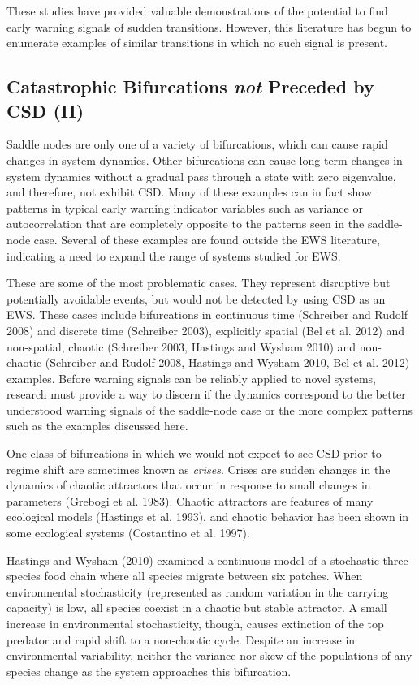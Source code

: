 \documentclass{article}
\begin{document}
These studies have provided valuable demonstrations of the potential to
find early warning signals of sudden transitions. However, this
literature has begun to enumerate examples of similar transitions in
which no such signal is present.

\subsection{Catastrophic Bifurcations \emph{not} Preceded by CSD (II)}

Saddle nodes are only one of a variety of bifurcations, which can cause
rapid changes in system dynamics. Other bifurcations can cause long-term
changes in system dynamics without a gradual pass through a state with
zero eigenvalue, and therefore, not exhibit CSD. Many of these examples
can in fact show patterns in typical early warning indicator variables
such as variance or autocorrelation that are completely opposite to the
patterns seen in the saddle-node case. Several of these examples are
found outside the EWS literature, indicating a need to expand the range
of systems studied for EWS.

These are some of the most problematic cases. They represent disruptive
but potentially avoidable events, but would not be detected by using CSD
as an EWS. These cases include bifurcations in continuous time
(Schreiber and Rudolf 2008) and discrete time (Schreiber 2003),
explicitly spatial (Bel et al. 2012) and non-spatial, chaotic (Schreiber
2003, Hastings and Wysham 2010) and non-chaotic (Schreiber and Rudolf
2008, Hastings and Wysham 2010, Bel et al. 2012) examples. Before
warning signals can be reliably applied to novel systems, research must
provide a way to discern if the dynamics correspond to the better
understood warning signals of the saddle-node case or the more complex
patterns such as the examples discussed here.

One class of bifurcations in which we would not expect to see CSD prior
to regime shift are sometimes known as \emph{crises}. Crises are sudden
changes in the dynamics of chaotic attractors that occur in response to
small changes in parameters (Grebogi et al. 1983). Chaotic attractors
are features of many ecological models (Hastings et al. 1993), and
chaotic behavior has been shown in some ecological systems (Costantino
et al. 1997).

Hastings and Wysham (2010) examined a continuous model of a stochastic
three-species food chain where all species migrate between six patches.
When environmental stochasticity (represented as random variation in the
carrying capacity) is low, all species coexist in a chaotic but stable
attractor. A small increase in environmental stochasticity, though,
causes extinction of the top predator and rapid shift to a non-chaotic
cycle. Despite an increase in environmental variability, neither the
variance nor skew of the populations of any species change as the system
approaches this bifurcation.
\end{document}
